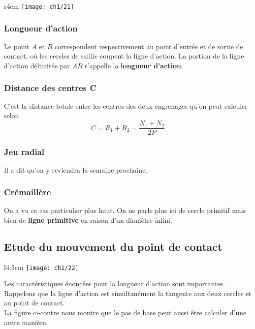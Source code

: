		\begin{wrapfigure}[4]{r}{4cm}
		\vspace{-5mm}
		\texttt{[image: ch1/21]}
		\end{wrapfigure}				 
	\subsubsection{Longueur d'action}
		Le point $A$ et $B$ correspondent respectivement au point d'entrée et de sortie de contact, où les cercles de saillie coupent la ligne d'action. La portion de la ligne d'action délimitée par $AB$ s'appelle la \textbf{longueur d'action}.
		
	\subsubsection{Distance des centres C}
		C'est la distance totale entre les centres des deux engrenages qu'on peut calculer selon
		\begin{equation}
			C = R_1 + R_2 = \frac{N_1 + N_2}{2P}
		\end{equation}
		
	\subsubsection{Jeu radial}
		Il a dit qu'on y reviendra la semaine prochaine. 
		
		
	\subsubsection{Crémaillère}
		On a vu ce cas particulier plus haut. On ne parle plus ici de cercle primitif mais bien de \textbf{ligne primitive} en raison d'un diamètre infini. 
		
\subsection{Etude du mouvement du point de contact}		
	\begin{wrapfigure}[7]{l}{4.5cm}
	\vspace{-5mm}
	\texttt{[image: ch1/22]}
	\end{wrapfigure}				 
	Les caractéristiques énoncées pour la longueur d'action sont importantes. Rappelons que la ligne d'action est simultanément la tangente aux deux cercles et au point de contact. \\
	La figure ci-contre nous montre que le pas de base peut aussi être calculer d'une autre manière.\\
	
